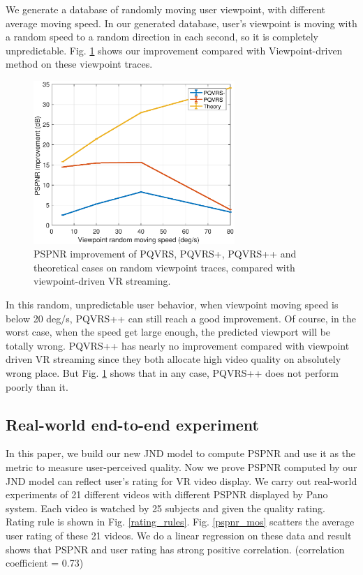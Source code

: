 We generate a database of randomly moving user viewpoint, with different average moving speed. In our generated database, user's viewpoint is moving with a random speed to a random direction in each second, so it is completely unpredictable. Fig. \ref{random_improvement} shows our improvement compared with Viewpoint-driven method on these viewpoint traces.

    \begin{figure}
  \centering
  \includegraphics[width=3in]{images/random_improvement.eps}
  \caption{PSPNR improvement of PQVRS, PQVRS+, PQVRS++ and theoretical cases on random viewpoint traces, compared with viewpoint-driven VR streaming.}
  \label{random_improvement}
  \end{figure}

In this random, unpredictable user behavior, when viewpoint moving speed is below 20 deg/s, PQVRS++ can still reach a good improvement. Of course, in the worst case, when the speed get large enough, the predicted viewport will be totally wrong. PQVRS++ has nearly no improvement compared with viewpoint driven VR streaming since they both allocate high video quality on absolutely wrong place. But Fig. \ref{random_improvement} shows that in any case, PQVRS++ does not perform poorly than it.

\subsection{Real-world end-to-end experiment}

In this paper, we build our new JND model to compute PSPNR and use it as the metric to measure user-perceived quality. Now we prove PSPNR computed by our JND model can reflect user's rating for VR video display. We carry out real-world experiments of 21 different videos with different PSPNR displayed by Pano system. Each video is watched by 25 subjects and given the quality rating. Rating rule is shown in Fig. \ref{rating_rules}. Fig. \ref{pspnr_mos} scatters the average user rating of these 21 videos. We do a linear regression on these data and result shows that PSPNR and user rating has strong positive correlation. (correlation coefficient = 0.73)

